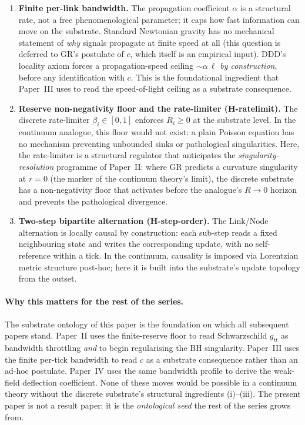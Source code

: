 \documentclass[11pt,a4paper]{article}
\begin{document}
\begin{enumerate}
\item \textbf{Finite per-link bandwidth.} The propagation
coefficient $\alpha$ is a structural rate, not a free
phenomenological parameter; it caps how fast information can
move on the substrate. Standard Newtonian gravity has no
mechanical statement of \emph{why} signals propagate at finite
speed at all (this question is deferred to GR's postulate of
$c$, which itself is an empirical input). DDD's locality axiom
forces a propagation-speed ceiling $\sim \alpha\,\ell$
\emph{by construction}, before any identification with $c$.
This is the foundational ingredient that Paper~III uses to
read the speed-of-light ceiling as a substrate consequence.

\item \textbf{Reserve non-negativity floor and the
rate-limiter (H-ratelimit).} The discrete rate-limiter
$\beta_i \in [0, 1]$ enforces $R_i \ge 0$ at the substrate
level. In the continuum analogue, this floor would not exist:
a plain Poisson equation has no mechanism preventing
unbounded sinks or pathological singularities. Here, the
rate-limiter is a structural regulator that anticipates the
\emph{singularity-resolution} programme of Paper~II: where GR
predicts a curvature singularity at $r = 0$ (the marker of the
continuum theory's limit), the discrete substrate has a
non-negativity floor that activates before the analogue's
$R \to 0$ horizon and prevents the pathological divergence.

\item \textbf{Two-step bipartite alternation (H-step-order).}
The Link/Node alternation is locally causal by construction:
each sub-step reads a fixed neighbouring state and writes the
corresponding update, with no self-reference within a tick. In
the continuum, causality is imposed via Lorentzian metric
structure post-hoc; here it is built into the substrate's
update topology from the outset.
\end{enumerate}

\paragraph{Why this matters for the rest of the series.}
The substrate ontology of this paper is the foundation on
which all subsequent papers stand. Paper~II uses the
finite-reserve floor to read Schwarzschild $g_{tt}$ as
bandwidth throttling \emph{and} to begin regularising the BH
singularity. Paper~III uses the finite per-tick bandwidth to
read $c$ as a substrate consequence rather than an ad-hoc
postulate. Paper~IV uses the same bandwidth profile to derive
the weak-field deflection coefficient. None of these moves
would be possible in a continuum theory without the discrete
substrate's structural ingredients (i)--(iii). The present
paper is not a result paper: it is the \emph{ontological seed}
the rest of the series grows from.
\end{document}
